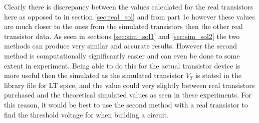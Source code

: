 \documentclass[titlepage, 12pt]{article}
\begin{document}
    Clearly there is discrepancy between the values calculated for the
    real transistors here as opposed to in section \ref{sec:real_sol}
    and from part 1c however these values are much closer to the ones
    from the simulated transistors then the other real transistor data.
    As seen in sections \ref{sec:sim_sol1} and \ref{sec:sim_sol2} the
    two methods can produce very similar and accurate results. However
    the second method is computationally significantly easier and can
    even be done to some extent in experiment. Being able to do this for
    the actual transistor device is more useful then the simulated as
    the simulated transistor $V_T$ is stated in the library file for LT
    spice, and the value could very slightly between real transistors
    purchased and the theoretical simulated values as seen in these
    experiments. For this reason, it would be best to use the second
    method with a real transistor to find the threshold voltage for when
    building a circuit.
\end{document}
